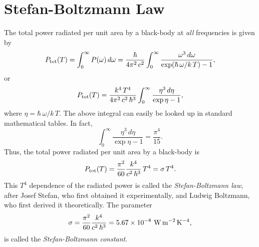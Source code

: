 \section{Stefan-Boltzmann Law}
The total power radiated per unit area by a black-body at {\em all}
frequencies is given by
\begin{equation}
P_{\rm tot}(T) = \int_0^\infty P(\omega) \, d\omega
= \frac{\hbar}{4\pi^2\, c^2} \int_0^\infty \frac{\omega^3\,d\omega}
{\exp(\hbar\,\omega/k\,T) - 1},
\end{equation}
or
\begin{equation}
P_{\rm tot}(T) =  \frac{k^4\, T^4 }{4\pi^2\, c^2\,\hbar^3} \int_0^\infty
\frac{\eta^3\,d\eta}{\exp\eta -1},
\end{equation}
where $\eta = \hbar\,\omega/k \,T$. The above integral can easily be looked up in
standard mathematical tables. In fact,
\begin{equation}
\int_0^\infty
\frac{\eta^3\,d\eta}{\exp\eta -1} = \frac{\pi^4}{15}.
\end{equation}
Thus, the total power radiated per unit area by a black-body is
\begin{equation}
P_{\rm tot}(T) = \frac{\pi^2}{60} \frac{k^4}{c^2\, \hbar^3} \,T^4 = \sigma \,T^4.
\end{equation}
This $T^4$ dependence of the radiated power is called the {\em Stefan-Boltzmann law},
after Josef Stefan, who first obtained it
experimentally, and Ludwig Boltzmann, who first derived it theoretically.
The parameter
\begin{equation}
\sigma = \frac{\pi^2}{60} \frac{k^4}{c^2\, \hbar^3} = 5.67\times 10^{-8}\,\,{\rm W}
\,{\rm m}^{-2} \,{\rm K}^{-4},
\end{equation}
is called the {\em Stefan-Boltzmann constant}.

